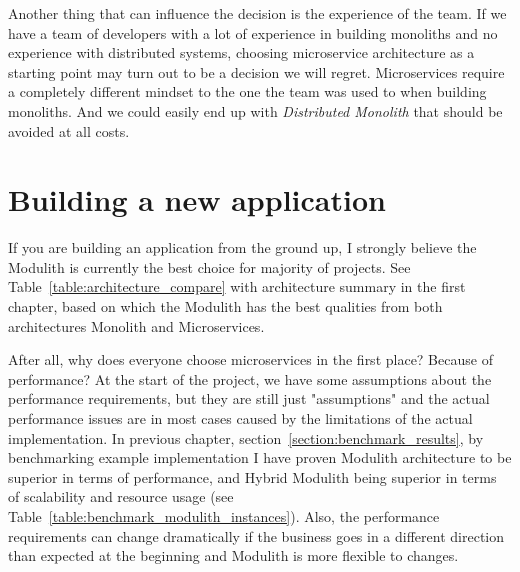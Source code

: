 Another thing that can influence the decision is the experience of the team. If we have a team of developers with a lot of experience in building monoliths and no experience with distributed systems, choosing microservice architecture as a starting point may turn out to be a decision we will regret. Microservices require a completely different mindset to the one the team was used to when building monoliths. And we could easily end up with \textit{Distributed Monolith} that should be avoided at all costs.

\section{Building a new application}
\label{section:building_new_app}
If you are building an application from the ground up, I strongly believe the Modulith is currently the best choice for majority of projects. See Table~\ref{table:architecture_compare} with architecture summary in the first chapter, based on which the Modulith has the best qualities from both architectures Monolith and Microservices. 

After all, why does everyone choose microservices in the first place? Because of performance? At the start of the project, we have some assumptions about the performance requirements, but they are still just "assumptions" and the actual performance issues are in most cases caused by the limitations of the actual implementation. In previous chapter, section~\ref{section:benchmark_results}, by benchmarking example implementation I have proven Modulith architecture to be superior in terms of performance, and Hybrid Modulith being superior in terms of scalability and resource usage (see Table~\ref{table:benchmark_modulith_instances}). Also, the performance requirements can change dramatically if the business goes in a different direction than expected at the beginning and Modulith is more flexible to changes.

